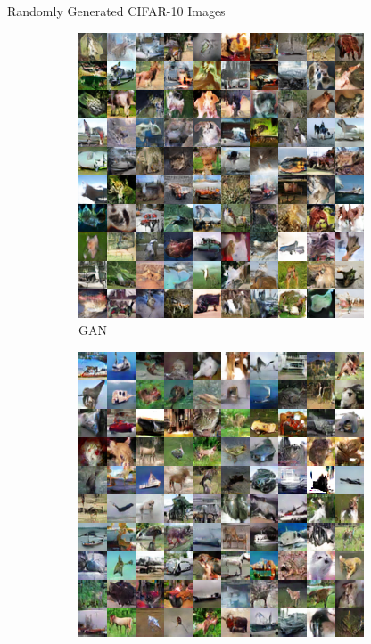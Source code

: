 \documentclass{beamer}
\begin{document}
{    \begin{frame}{Randomly Generated CIFAR-10 Images}
      \begin{figure}
        \pause
        \centering
        \begin{subfigure}{.49\textwidth}
          \centering
          \includegraphics[width=\textwidth]{../img/gan_cifar10_randomly_generated.png}
          \caption{GAN}
          \label{fig:gan_cifar10_randomly_generated}
        \end{subfigure}
        \pause
        \begin{subfigure}{.49\textwidth}
          \centering
          \includegraphics[width=\textwidth]{../img/capsgan_cifar10_randomly_generated.png}

\end{subfigure}
\end{figure}
\end{frame}}
\end{document}

